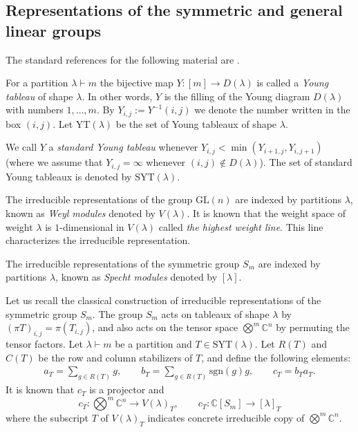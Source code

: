\documentclass[12pt, reqno]{amsart}
\theoremstyle{definition}
\newcommand{\sgn}{\mathrm{sgn}}
\begin{document}
\subsection{Representations of the symmetric and general linear groups} 
The standard references for the following material are \cite{fh, ful}.

For a partition $\lambda \vdash m$ the bijective map $Y: [m] \to D(\lambda)$ is called a \textit{Young tableau} of shape $\lambda$. In other words, $Y$ is the filling of the Young diagram $D(\lambda)$ with numbers $1,\ldots,m$. By $Y_{i,j} := Y^{-1}(i,j)$ we denote the number written in the box $(i,j)$.  Let $\mathrm{YT}(\lambda)$ be the set of  Young tableaux of shape $\lambda$. 

We call $Y$ a \textit{standard Young tableau} whenever $Y_{i,j} < \min(Y_{i+1,j}, Y_{i,j+1})$ (where we assume that $Y_{i,j} = \infty$ whenever $(i,j) \not\in D(\lambda)$). The set of standard Young tableaux is denoted by $\mathrm{SYT}(\lambda)$.

The irreducible representations of the group $\mathrm{GL}(n)$ are indexed by partitions $\lambda$, known as \textit{Weyl modules} denoted by $V(\lambda)$. It is known that the weight space of weight $\lambda$ is $1$-dimensional in $V(\lambda)$ called \textit{the highest weight line}. This line characterizes the irreducible representation.

The irreducible representations of the symmetric group $S_m$ are indexed by partitions $\lambda$, known as  \textit{Specht modules} denoted by $[\lambda]$. %

Let us recall the classical construction of irreducible representations of the symmetric group $S_{m}$. The group $S_{m}$ acts on tableaux of shape $\lambda$ by $(\pi T)_{i,j}=\pi(T_{i,j})$, and also acts on the tensor space $\bigotimes^{m} \mathbb{C}^n$ by permuting the tensor factors.
Let $\lambda \vdash m$ be a partition and $T \in \mathrm{SYT}(\lambda)$. Let $R(T)$ and $C(T)$ be the row and column stabilizers of $T$, and define the following elements: 
\begin{align*}
    a_{T} = \sum_{g \in R(T)}g, \qquad b_{T} = \sum_{g \in R(T)}\sgn(g) g, \qquad c_T = b_T a_T.
\end{align*}
It is known that $c_{T}$ is a projector and
$$
c_{T}: \bigotimes^{m}\mathbb{C}^{n} \to V(\lambda)_{T}, \qquad c_{T}: \mathbb{C}[S_{m}] \to [\lambda]_T
$$
where the subscript $T$ of $V(\lambda)_{T}$ indicates concrete irreducible copy of $\bigotimes^m \mathbb{C}^n$.
\end{document}
